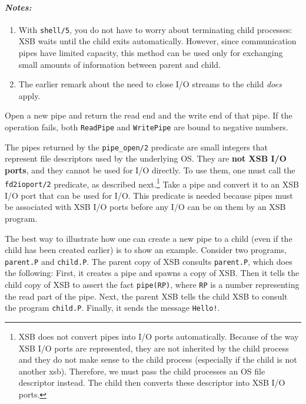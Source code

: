 \begin{description}
\paragraph{\em Notes:}
\begin{enumerate}
  \item  With {\tt shell/5}, you do not have to worry about terminating
    child processes: XSB waits until the child exits automatically.
    However, since communication pipes have limited capacity, this method
    can be used only for exchanging small amounts of information between
    parent and child.
  \item The earlier remark about the need to close I/O streams to the child
    \emph{does} apply.
\end{enumerate}

  Open a new pipe and return the read end and the write end of that pipe.
  If the operation fails, both {\tt ReadPipe} and {\tt WritePipe} are bound
  to negative numbers.
  
  The pipes returned by the {\tt pipe\_open/2} predicate are small integers
  that represent file descriptors used by the underlying OS. They are {\bf
    not XSB I/O ports}, and they cannot be used for I/O directly. To
  use them, one must call the {\tt fd2ioport/2} predicate, as described
  next.\footnote{
    XSB does not convert pipes into I/O ports automatically.
    Because of the way XSB I/O ports are represented, they are not
    inherited by the child process and they do not make sense to the child
    process (especially if the child is not another xsb). Therefore, we
    must pass the child processes an OS file descriptor instead. The child then
    converts these descriptor into XSB I/O ports.
    }
    Take a pipe and convert it to an XSB I/O port that can be used
    for I/O. This predicate is needed because pipes must be associated with
    XSB I/O ports before any I/O can be on them by an XSB program.

    The best way to illustrate how one can create a new pipe to a child
    (even if the child has been created earlier) is to show an example.
    Consider two programs, {\tt parent.P} and {\tt child.P}. The parent
    copy of XSB consults {\tt parent.P}, which does the following: First, it
    creates a pipe and spawns a copy of XSB. Then it tells the
    child copy of XSB to assert the fact {\tt pipe(RP)}, where {\tt RP} is
    a number representing the read part of the pipe. Next, the parent XSB tells
    the child XSB to consult the program {\tt child.P}. Finally, it sends
    the message {\tt Hello!}.


\end{description}

